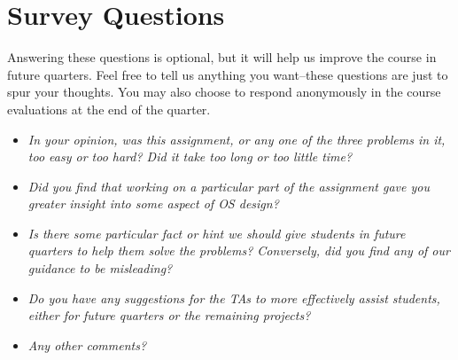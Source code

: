 \documentclass[journal]{IEEEtran}
\begin{document}
\section{Survey Questions}
Answering these questions is optional, but it will help us improve the
course in future quarters.  Feel free to tell us anything you
want--these questions are just to spur your thoughts.  You may also
choose to respond anonymously in the course evaluations at the end of
the quarter.

\begin{itemize}
\item \textit{In your opinion, was this assignment, or any one of the three problems in it, too easy or too hard?  Did it take too long or too little time?}

\item \textit{Did you find that working on a particular part of the assignment gave you greater insight into some aspect of OS design?}

\item \textit{Is there some particular fact or hint we should give students in future quarters to help them solve the problems?  Conversely, did you find any of our guidance to be misleading?}

\item \textit{Do you have any suggestions for the TAs to more effectively assist students, either for future quarters or the remaining projects?}

\item \textit{Any other comments?}
\end{itemize}
\end{document}
